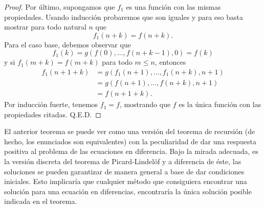 \documentclass[letter,10pt,notitlepage]{amsart}
\theoremstyle{definition}
\theoremstyle{remark}
\begin{document}
\begin{proof}
  Por último, supongamos que \( f_1\) es una función con las
  mismas propiedades. Usando inducción probaremos que son iguales
  y para eso basta mostrar para todo natural \( n\) que
  \[ f_1(n+k) = f(n+k).\] Para el caso base, debemos observar que
  \[ f_1(k) = g(f(0),\dots,f(n+k-1),0) = f(k)\]
  y si \( f_1(m+k) = f(m+k)\) para todo \( m \leq n\),
  entonces
  \begin{align*}
    f_1(n+1+k) &= g(f_1(n+1),\dots,f_1(n+k),n+1) \\
     &= g(f(n+1),\dots,f(n+k),n+1) \\
     &= f(n+1+k).
  \end{align*}
  Por inducción fuerte, tenemos \( f_1 = f\), mostrando
  que \( f\) es la única función con las propiedades citadas. Q.E.D.
\end{proof}

El anterior teorema se puede ver como una versión
del teorema de recursión (de hecho, los enunciados son equivalentes)
con la peculiaridad de dar una respuesta positiva al problema de las 
ecuaciones en diferencia. Bajo la mirada adecuada, es la versión
discreta del teorema de Picard-Lindelöf y a diferencia de éste, las 
soluciones se pueden garantizar de manera general a base de dar 
condiciones iniciales. Esto implicaría que cualquier método que
consiguiera encontrar una solución para una ecuación en diferencias,
encontraría la única solución posible indicada en el teorema.
\end{document}
